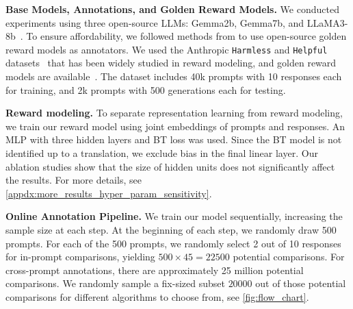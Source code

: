 
\textbf{Base Models, Annotations, and Golden Reward Models.} 
We conducted experiments using three open-source LLMs: Gemma2b, Gemma7b, and LLaMA3-8b~\citep{team2024gemma, meta2024introducing}. To ensure affordability, we followed methods from \citet{gao2023scaling, liu2023statistical, tran2024snorkel, dong2024rlhf, sun2024rethinking} to use open-source golden reward models as annotators. We used the Anthropic \texttt{Harmless} and \texttt{Helpful} datasets~\citep{bai2022training} that has been widely studied in reward modeling, and golden reward models are available~\citep{yang2024rewards, dong2023raft, dong2024rlhf}. The dataset includes 40k prompts with 10 responses each for training, and 2k prompts with 500 generations each for testing.

\textbf{Reward modeling.} To separate representation learning from reward modeling, we train our reward model using joint embeddings of prompts and responses. An MLP with three hidden layers and BT loss was used. Since the BT model is not identified up to a translation, we exclude bias in the final linear layer. Our ablation studies show that the size of hidden units does not significantly affect the results. For more details, see \cref{appdx:more_results_hyper_param_sensitivity}.


\textbf{Online Annotation Pipeline.} 
We train our model sequentially, increasing the sample size at each step. At the beginning of each step, we randomly draw 500 prompts. For each of the 500 prompts, we randomly select 2 out of 10 responses for in-prompt comparisons, yielding $500\times 45 = 22500$ potential comparisons. For cross-prompt annotations, there are approximately 25 million potential comparisons. We randomly sample a fix-sized subset $20000$ out of those potential comparisons for different algorithms to choose from, see \cref{fig:flow_chart}. 

